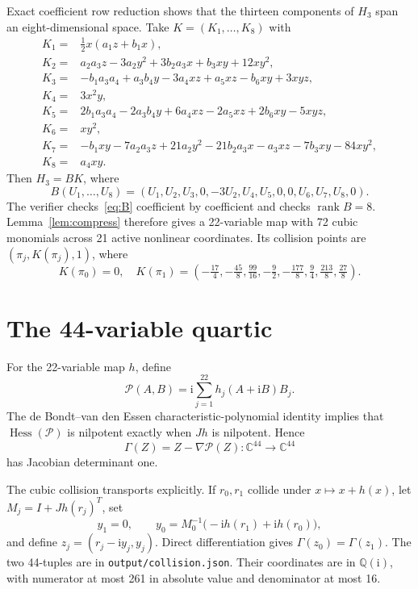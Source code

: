 \documentclass[11pt]{article}
\newcommand{\C}{\mathbb C}
\newcommand{\Q}{\mathbb Q}
\newcommand{\ii}{\mathrm i}
\newcommand{\cP}{\mathcal P}
\newcommand{\Hess}{\operatorname{Hess}}
\begin{document}
Exact coefficient row reduction shows that the thirteen components of $H_3$
span an eight-dimensional space. Take $K=(K_1,\ldots,K_8)$ with
\begin{align}
K_1={}&\tfrac12x(a_1z+b_1x),\nonumber\\
K_2={}&a_2a_3z-3a_2y^2+3b_2a_3x+b_3xy+12xy^2,\nonumber\\
K_3={}&-b_1a_3a_4+a_3b_4y-3a_4xz+a_5xz-b_6xy+3xyz,\nonumber\\
K_4={}&3x^2y,\nonumber\\
K_5={}&2b_1a_3a_4-2a_3b_4y+6a_4xz-2a_5xz+2b_6xy-5xyz,
\label{eq:K}\\
K_6={}&xy^2,\nonumber\\
K_7={}&-b_1xy-7a_2a_3z+21a_2y^2-21b_2a_3x-a_3xz
-7b_3xy-84xy^2,\nonumber\\
K_8={}&a_4xy.\nonumber
\end{align}
Then $H_3=BK$, where
\begin{equation}
B(U_1,\ldots,U_8)=
(U_1,U_2,U_3,0,-3U_2,U_4,U_5,0,0,U_6,U_7,U_8,0).
\label{eq:B}
\end{equation}
The verifier checks~\eqref{eq:B} coefficient by coefficient and checks
$\operatorname{rank}B=8$. Lemma~\ref{lem:compress} therefore gives a
22-variable map with 72 cubic monomials across 21 active nonlinear
coordinates. Its collision points are $(\pi_j,K(\pi_j),1)$, where
\begin{equation}
K(\pi_0)=0,\quad
K(\pi_1)=(-\tfrac{17}4,-\tfrac{45}8,\tfrac{99}{16},
-\tfrac92,-\tfrac{177}8,\tfrac94,\tfrac{213}8,\tfrac{27}8).
\end{equation}

\section{The 44-variable quartic}

For the 22-variable map $h$, define
\begin{equation}
\boxed{\cP(A,B)=\ii\sum_{j=1}^{22}h_j(A+\ii B)B_j.}
\label{eq:P}
\end{equation}
The de Bondt--van den Essen characteristic-polynomial identity
\cite{debondt-vandenessen} implies that $\Hess(\cP)$ is nilpotent exactly when
$Jh$ is nilpotent. Hence
\begin{equation}
\Gamma(Z)=Z-\nabla\cP(Z):\C^{44}\to\C^{44}
\end{equation}
has Jacobian determinant one.

The cubic collision transports explicitly. If $r_0,r_1$ collide under
$x\mapsto x+h(x)$, let $M_j=I+Jh(r_j)^T$, set
\begin{equation}
y_1=0,\qquad y_0=M_0^{-1}\bigl(-\ii h(r_1)+\ii h(r_0)\bigr),
\end{equation}
and define $z_j=(r_j-\ii y_j,y_j)$. Direct differentiation gives
$\Gamma(z_0)=\Gamma(z_1)$. The two 44-tuples are in
\texttt{output/collision.json}. Their coordinates are in $\Q(\ii)$, with
numerator at most 261 in absolute value and denominator at most 16.
\end{document}
